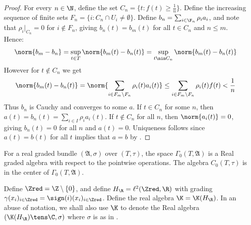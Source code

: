 \begin{proof}
	For every $n\in \N$, define the set $C_n=\{t:f(t)\geq \frac{1}{n}\}$. Define the increasing sequence of finite sets $F_n=\{i:C_n\cap U_i\neq \emptyset\}$. Define $b_n=\sum_{i\in \F_n} \rho_i a_i$, and note that $\rho_i|_{C_n}=0$ for $i\nin F_n$, giving $b_n(t)=b_m(t)$ for all $t\in C_n$ and $n\leq m$. Hence:
	\begin{align*}
		\norm{b_m-b_n}=\sup_{t\in T}\norm{b_m(t)-b_n(t)}=\sup_{t\nin C_n}\norm{b_m(t)-b_n(t)}
	\end{align*}
	However for $t\nin C_n$ we get
	\begin{align*}	
		\norm{b_m(t)-b_n(t)}=\norm{\sum_{i\in F_m\setminus F_n} \rho_i(t)a_i(t)}\leq \sum_{i\in F_m\setminus F_n} \rho_i(t)f(t) <\frac{1}{n}
	\end{align*}
	Thus $b_n$ is Cauchy and converges to some $a$. If $t\in C_n$ for some $n$, then ${a(t)=b_n(t)=\sum_{i\in I} \rho_i a_i(t)}$. If $t\nin C_n$ for all $n$, then $\norm{a_i(t)}=0$, giving $b_n(t)=0$ for all $n$ and $a(t)=0$. Uniqueness follows since $a(t)=b(t)$ for all $t$ implies that $a=b$ by .
\end{proof}
\begin{comment}
We still need to see that the picture of Real graded continuous trace algebras as section algebras preserves the Real structure.
\begin{corollary}
	Given a Real graded Banach bundle $\mathfrak{A}$ over a Real space $(T,\tau)$, sections fixed under the involution $\sigma$ on $\mathfrak{A}$ always exist. 
\end{corollary}
\begin{proof}
	Pick $t\in T$ and $a\in A(t)$. By \cref{raeburnlemmaX}  there is a section such that $s(t)=a$. For every $t\in T$ the elements $s(t)$ and $\sigma_{\tau(t)}(s(\tau(t))$ belong to $A_t$, so the map $\tilde{s}=\frac{1}{2}(s+\sigma(s))$ is a well-defined section, invariant under $\sigma$. 
\end{proof}
\end{comment}
\begin{remark}
	For a real graded \Cstar bundle $(\mathfrak{A},\sigma)$ over $(T,\tau)$, the space $\Gamma_0(T,\mathfrak{A})$ is a Real graded \Cstar algebra with respect to the pointwise operations. The algebra $C_0(T,\tau)$ is in the center of $\Gamma_0(T,\mathfrak{A})$.  
\end{remark}
\begin{definition}
	Define $\Zred=\Z\setminus \{0\}$, and define $H_\R=\ell^2(\Zred,\R)$ with grading $\gamma(x_i)_{i\in \Zred}=\sign(i)(x_i)_{i\in \Zred}$. Define the real algebra $\K=\K(H_\R)$. In an abuse of notation, we shall also use $\K$ to denote the Real algebra $(\K(H_\R)\tens \C,\sigma)$ where $\sigma$ is as in . 
\end{definition}
